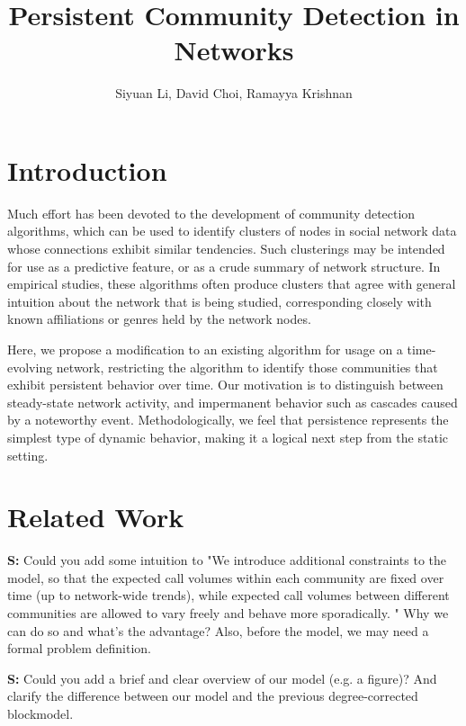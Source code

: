 \documentclass{article}
\begin{document}
\title{Persistent Community Detection in Networks}
\author{Siyuan Li, David Choi, Ramayya Krishnan}

\maketitle


\begin{abstract}

\end{abstract}

\section{Introduction}

Much effort has been devoted to the development of community detection algorithms, which can be used to identify clusters of nodes in social network data whose connections exhibit similar tendencies. Such clusterings may be intended for use as a predictive feature, or as a crude summary of network structure. In empirical studies, these algorithms often produce clusters that agree with general intuition about the network that is being studied, corresponding closely with known affiliations or genres held by the network nodes. 

Here, we propose a modification to an existing algorithm for usage on a time-evolving network, restricting the algorithm to identify those communities that exhibit persistent behavior over time. Our motivation is to distinguish between steady-state network activity, and impermanent behavior such as cascades caused by a noteworthy event. Methodologically, we feel that persistence represents the simplest type of dynamic behavior, making it a logical next step from the static setting. 

\section{Related Work}

\textbf{S:} Could you add some intuition to "We introduce additional constraints to the model, so that the expected call volumes within each community are fixed over time (up to network-wide trends), while expected call volumes between different communities are allowed to vary freely and behave more sporadically. " Why we can do so and what's the advantage? Also, before the model, we may need a formal problem definition. 

\textbf{S:} Could you add a brief and clear overview of our model (e.g. a figure)? And clarify the difference between our model and the previous degree-corrected blockmodel.
\end{document}
